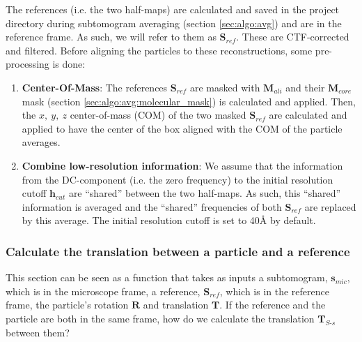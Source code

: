 The references (i.e. the two half-maps) are calculated and saved in the project directory during subtomogram averaging (section \ref{sec:algo:avg}) and are in the reference frame. As such, we will refer to them as $\bm{S}_{ref}$. These are CTF-corrected and filtered. Before aligning the particles to these reconstructions, some pre-processing is done:
\begin{enumerate}
    \item \textbf{Center-Of-Mass}: The references $\bm{S}_{ref}$ are masked with $\bm{M}_{ali}$ and their $\bm{M}_{core}$ mask (section \ref{sec:algo:avg:molecular_mask}) is calculated and applied. Then, the $x,\ y,\ z$ center-of-mass (COM) of the two masked $\bm{S}_{ref}$ are calculated and applied to have the center of the box aligned with the COM of the particle averages.

    \item \textbf{Combine low-resolution information}: We assume that the information from the DC-component (i.e. the zero frequency) to the initial resolution cutoff $\bm{h}_{cut}$ are ``shared'' between the two half-maps. As such, this ``shared'' information is averaged and the ``shared'' frequencies of both $\bm{S}_{ref}$ are replaced by this average. The initial resolution cutoff is set to 40\r{A} by default.
\end{enumerate}

\subsubsection{Calculate the translation between a particle and a reference} \label{sec:algo:align:get_translation}

This section can be seen as a function that takes as inputs a subtomogram, $\bm{s}_{mic}$, which is in the microscope frame, a reference, $\bm{S}_{ref}$, which is in the reference frame, the particle's rotation $\bm{R}$ and translation $\bm{T}$. If the reference and the particle are both in the same frame, how do we calculate the translation $\bm{T}_{S\text{-}s}$ between them?

